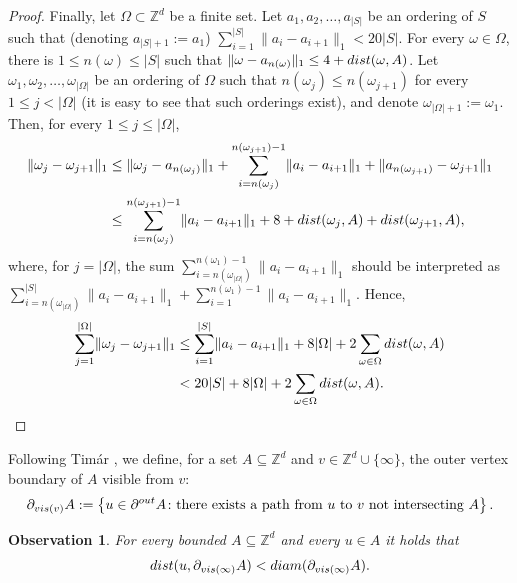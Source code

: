 \documentclass[11pt, reqno]{amsart}
\newtheorem{obs}[theorem]{Observation}
\numberwithin{equation}{section}
\begin{document}
\begin{proof}
Finally, let $\Omega\subset{\mathbb Z}^d$ be a finite set.
Let $a_1,a_2,\ldots,a_{\lvert S\rvert}$ be an ordering of $S$ such that (denoting $a_{\lvert S\rvert+1}:=a_1$)
$\sum_{i=1}^{\lvert S\rvert}\lVert a_i-a_{i+1}\rVert_1<20\lvert S\rvert$.
For every $\omega\in\Omega$, there is $1\leq n(\omega)\leq |S|$ such that $\lVert \omega-a_{n(\omega)}\rVert_1\leq 4+{\rm dist}(\omega,A)$.
Let $\omega_1,\omega_2,\ldots,\omega_{|\Omega|}$ be an ordering of $\Omega$ such that $n(\omega_j)\leq n(\omega_{j+1})$ for every $1\leq j<|\Omega|$ (it is easy to see that such orderings exist), and denote $\omega_{\lvert \Omega\rvert+1}:=\omega_1$.
Then, for every $1\leq j\leq|\Omega|$,
\begin{align*}
\lVert \omega_j-\omega_{j+1}\rVert_1&\leq \lVert \omega_j-a_{n(\omega_j)}\rVert_1+\sum_{i=n(\omega_j)}^{n(\omega_{j+1})-1}\lVert a_i-a_{i+1}\rVert_1+\lVert a_{n(\omega_{j+1})}-\omega_{j+1}\rVert_1\\
&\leq \sum_{i=n(\omega_j)}^{n(\omega_{j+1})-1}\lVert a_i-a_{i+1}\rVert_1+8+{\rm dist}(\omega_j,A)+{\rm dist}(\omega_{j+1},A),
\end{align*}
where, for $j=\lvert\Omega\rvert$, the sum $\sum_{i=n(\omega_{\lvert\Omega\rvert})}^{n(\omega_1)-1}\lVert a_i-a_{i+1}\rVert_1$  should be interpreted as $\sum_{i=n(\omega_{\lvert\Omega\rvert})}^{\lvert S\rvert}\lVert a_i-a_{i+1}\rVert_1+\sum_{i=1}^{n(\omega_1)-1}\lVert a_i-a_{i+1}\rVert_1$.
Hence,
\begin{align*}
\sum_{j=1}^{\lvert\Omega\rvert}\lVert \omega_j-\omega_{j+1}\rVert_1&\leq \sum_{i=1}^{\lvert S\rvert}\lVert a_i-a_{i+1}\rVert_1+8\lvert\Omega\rvert+2\sum_{\omega\in\Omega}{\rm dist}(\omega,A)\\
&<20\lvert S\rvert+8\lvert\Omega\rvert+2\sum_{\omega\in\Omega}{\rm dist}(\omega,A).
\qedhere
\end{align*}
\end{proof}

Following Tim\'{a}r \cite{T}, we define, for a set $A\subseteq{\mathbb Z}^d$ and $v\in{\mathbb Z}^d\cup\{\infty\}$, the outer vertex boundary of $A$ visible from $v$:
\begin{equation}\label{eq:viz}
\partial_{{\rm vis}(v)}A:=
\left\{u\in\partial^{\rm out}A\colon \text{there exists a path from } u \text{ to } v \text{ not intersecting } A \right\}.
\end{equation}

\begin{obs}\label{obs:diam_viz}
For every bounded $A\subseteq{\mathbb Z}^d$ and every $u\in A$ it holds that  \begin{equation*}
{\rm dist}(u,\partial_{{\rm vis}(\infty)}A)<{\rm diam}(\partial_{{\rm vis}(\infty)}A).
\end{equation*}
\end{obs}
\end{document}
